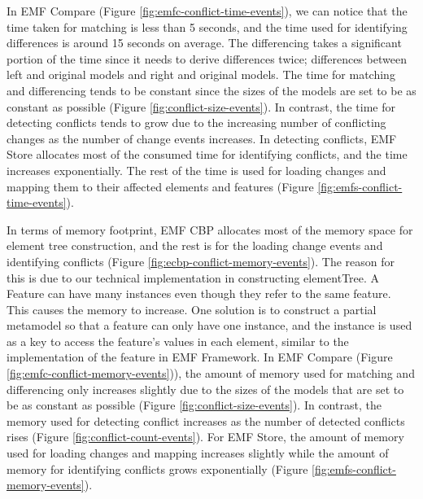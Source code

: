 In EMF Compare (Figure \ref{fig:emfc-conflict-time-events}), we can notice that the time taken for matching is less than 5 seconds, and the time used for identifying differences is around 15 seconds on average. The differencing takes a significant portion of the time since it needs to derive differences twice; differences between left and original models and right and original models. The time for matching and differencing tends to be constant since the sizes of the models are set to be as constant as possible (Figure \ref{fig:conflict-size-events}). In contrast, the time for detecting conflicts tends to grow due to the increasing number of conflicting changes as the number of change events increases. In detecting conflicts, EMF Store allocates most of the consumed time for identifying conflicts, and the time increases exponentially. The rest of the time is used for loading changes and mapping them to their affected elements and features (Figure \ref{fig:emfs-conflict-time-events}). 

In terms of memory footprint, EMF CBP allocates most of the memory space for element tree construction, and the rest is for the loading change events and identifying conflicts (Figure \ref{fig:ecbp-conflict-memory-events}). The reason for this is due to our technical implementation in constructing \textsf{elementTree}. A Feature can have many instances even though they refer to the same feature. This causes the memory to increase. One solution is to construct a partial metamodel so that a feature can only have one instance, and the instance is used as a key to access the feature's values in each element, similar to the implementation of the feature in EMF Framework. In EMF Compare (Figure \ref{fig:emfc-conflict-memory-events})), the amount of memory used for matching and differencing only increases slightly due to the sizes of the models that are set to be as constant as possible (Figure \ref{fig:conflict-size-events}). In contrast, the memory used for detecting conflict increases as the number of detected conflicts rises (Figure \ref{fig:conflict-count-events}). For EMF Store, the amount of memory used for loading changes and mapping increases slightly while the amount of memory for identifying conflicts grows exponentially (Figure \ref{fig:emfs-conflict-memory-events}).

